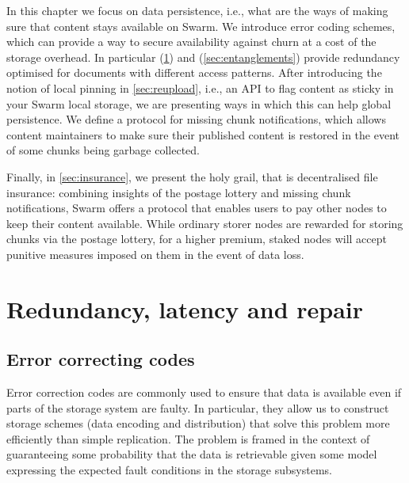 In this chapter we focus on data persistence, i.e., what are the ways of making sure that content stays available on Swarm. 
We introduce error coding schemes, which can provide a way to secure availability against churn at a cost of the storage overhead. 
In particular  (\ref{sec:repair}) 
and  (\ref{sec:entanglements}) 
provide redundancy optimised for documents with different access patterns.
After introducing the notion of local pinning  in \ref{sec:reupload}, i.e., an API to flag content as sticky in your Swarm local storage, we are presenting ways in which this can help global persistence. We define a protocol for missing chunk notifications, which allows content maintainers to make sure their published content is restored in the event of some chunks being garbage collected.

Finally, in \ref{sec:insurance}, we present the holy grail, that is decentralised file insurance: combining insights of the postage lottery and missing chunk notifications, Swarm offers a protocol that enables users to pay other nodes to keep their content available. While ordinary storer nodes are rewarded for storing chunks via the postage lottery, for a higher premium, staked nodes will accept punitive measures imposed on them in the event of data loss.


\section{Redundancy, latency and repair}\label{sec:repair}

\green{}

\subsection{Error correcting codes}\label{sec:error-correcting-codes}

Error correction codes are commonly used to ensure that data is available even if parts of the storage system are faulty. In particular, they allow us to construct storage schemes (data encoding and distribution) that solve this problem more efficiently than simple replication. The problem is framed in the context of guaranteeing some probability that the data is retrievable given some model expressing the expected fault conditions in the storage subsystems.

